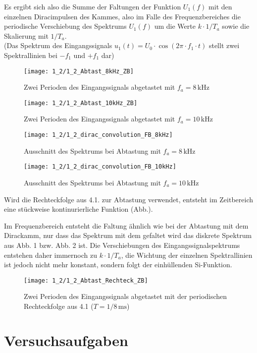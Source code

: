 \documentclass[a4paper, 12pt]{article}
\begin{document}
Es ergibt sich also die Summe der Faltungen der Funktion $U_1(f)$ mit den einzelnen
Diracimpulsen des Kammes, also im Falle des Frequenzbereiches die periodische Verschiebung
des Spektrums $U_1(f)$ um die Werte $k \cdot 1/T_a$ sowie die Skalierung mit
$1/T_a$.\\

(Das Spektrum des Eingangssignals $u_1(t) = U_0 \cdot \cos{(2 \pi \cdot
  f_1 \cdot t)}$ stellt zwei Spektrallinien bei $-f_1$ und $+f_1$ dar)




\begin{figure}[H]
	\texttt{[image: 1\_2/1\_2\_Abtast\_8kHz\_ZB]}
  \caption{Zwei Perioden des Eingangssignals abgetastet mit $f_a=8\,\si{\kilo\hertz}$}
\end{figure}

\begin{figure}[H]
	\texttt{[image: 1\_2/1\_2\_Abtast\_10kHz\_ZB]}
  \caption{Zwei Perioden des Eingangssignals abgetastet mit $f_a=10\,\si{\kilo\hertz}$}
\end{figure}

\begin{figure}[H]
	\texttt{[image: 1\_2/1\_2\_dirac\_convolution\_FB\_8kHz]}
  \caption{Ausschnitt des Spektrums bei Abtastung mit $f_a = 8 \, \si{\kilo\hertz}$}
\end{figure}

\begin{figure}[H]
	\texttt{[image: 1\_2/1\_2\_dirac\_convolution\_FB\_10kHz]}
  \caption{Ausschnitt des Spektrums bei Abtastung mit $f_a = 10 \, \si{\kilo\hertz}$}
\end{figure}

Wird die Rechteckfolge aus 4.1. zur Abtastung verwendet, entsteht im Zeitbereich
eine stückweise kontinurierliche Funktion (Abb.).

Im Frequenzbereich entsteht die Faltung ähnlich wie bei der Abtastung mit dem
Dirackamm, nur dass das Spektrum mit dem gefaltet wird das diskrete Spektrum aus
Abb. 1 bzw. Abb. 2 ist.
Die Verschiebungen des Eingangssignalspektrums entstehen daher immernoch zu $k
\cdot 1/T_a$, die Wichtung der einzelnen Spektrallinien
ist jedoch nicht mehr konstant, sondern folgt der einhüllenden Si-Funktion.

\begin{figure}[H]
	\texttt{[image: 1\_2/1\_2\_Abtast\_Rechteck\_ZB]}
  \caption{Zwei Perioden des Eingangssignals abgetastet mit der periodischen
    Rechteckfolge aus 4.1 ($T=1/8 \,\si{\milli\second}$)}
\end{figure}

\section{Versuchsaufgaben}
\end{document}
